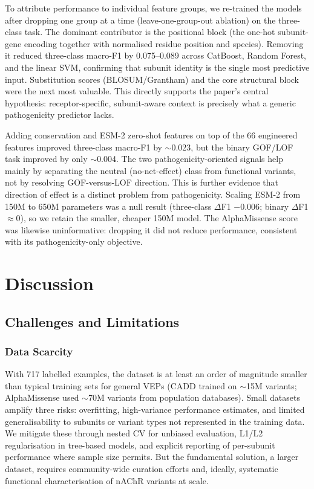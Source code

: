 \documentclass{ws-procs11x85}
\begin{document}
To attribute performance to individual feature groups, we re-trained the
models after dropping one group at a time (leave-one-group-out ablation)
on the three-class task. The dominant contributor is the positional
block (the one-hot subunit-gene encoding together with normalised
residue position and species). Removing it reduced three-class macro-F1
by 0.075--0.089 across CatBoost, Random Forest, and the linear SVM,
confirming that subunit identity is the single most predictive input.
Substitution scores (BLOSUM/Grantham) and the core structural block were
the next most valuable. This directly supports the paper's central
hypothesis: receptor-specific, subunit-aware context is precisely what a
generic pathogenicity predictor lacks.

Adding conservation and ESM-2 zero-shot features on top of the 66
engineered features improved three-class macro-F1 by $\sim$0.023, but
the binary GOF/LOF task improved by only $\sim$0.004. The two
pathogenicity-oriented signals help mainly by separating the neutral
(no-net-effect) class from functional variants, not by resolving
GOF-versus-LOF direction. This is further evidence that direction of effect is
a distinct problem from pathogenicity. Scaling ESM-2 from 150M to 650M
parameters was a null result (three-class $\Delta$F1 $-0.006$; binary
$\Delta$F1 $\approx 0$), so we retain the smaller, cheaper 150M model.
The AlphaMissense score was likewise uninformative: dropping it did not
reduce performance, consistent with its pathogenicity-only objective.

\section{Discussion}\label{sec:discussion}

\subsection{Challenges and Limitations}

\subsubsection{Data Scarcity}

With 717 labelled examples, the dataset is at least an order of
magnitude smaller than typical training sets for general VEPs (CADD
trained on $\sim$15M variants; AlphaMissense used $\sim$70M variants
from population databases). Small datasets amplify three risks:
overfitting, high-variance performance estimates, and limited
generalisability to subunits or variant types not represented in the
training data. We mitigate these through nested CV for unbiased
evaluation, L1/L2 regularisation in tree-based models, and explicit
reporting of per-subunit performance where sample size permits. But
the fundamental solution, a larger dataset, requires community-wide
curation efforts and, ideally, systematic functional characterisation
of nAChR variants at scale.
\end{document}
